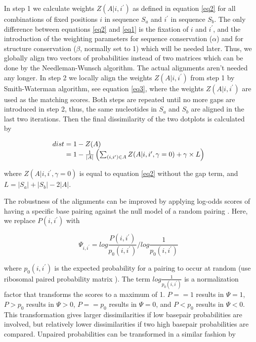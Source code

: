 \documentclass[a4paper,twoside]{article}
\begin{document}
In step 1 we calculate weights $Z(A|i,i^\prime)$ as defined in equation
\ref{eq2} for all combinations of fixed positions $i$ in sequence $S_a$ and
$i^\prime$ in sequence $S_b$.  The only difference between equations \ref{eq2}
and \ref{eq1} is the fixation of $i$ and $i^\prime$, and the introduction of the
weighting parameters for sequence conservation ($\alpha$) and for structure
conservation ($\beta$, normally set to 1) which will be needed later.  Thus, we
globally align two vectors of probabilities instead of two matrices which can be
done by the Needleman-Wunsch algorithm. The actual alignments aren't needed any
longer.  In step 2 we locally align the weights $Z(A|i,i^\prime)$ from step 1 by
Smith-Waterman algorithm, see equation \ref{eq3}, where the weights
$Z(A|i,i^\prime)$ are used as the matching scores.  Both steps are repeated
until no more gaps are introduced in step 2, thus, the same nucleotides in $S_a$
and $S_b$ are aligned in the last two iterations. Then the final dissimilarity
of the two dotplots is calculated by

\begin{equation}\label{eq4}
\arraycolsep=1.4pt
\begin{array}{rl}
	dist = & 1 - Z(A) \\
	     = & 1 - \frac{1}{|A|} \left( \sum_{(i,i^\prime) \in A} Z(A|i,i^\prime,\gamma=0) + \gamma \times L \right)
\end{array}
\end{equation}

where $Z(A|i,i^\prime,\gamma=0)$ is equal to equation \ref{eq2} without the gap
term, and $L = |S_a|+|S_b|-2|A|$.

The robustness of the alignments can be improved by applying log-odds scores of
having a specific base pairing against the null model of a random pairing
\cite{Will17432929}.  Here, we replace $P(i,i^\prime)$ with 

\begin{equation}
	\Psi_{i,i^\prime} = log \frac{P(i,i^\prime)}{p_0(i,i^\prime)} / log
	\frac{1}{p_0(i,i^\prime)} 
\end{equation}

where $p_0(i,i^\prime)$ is the expected probability for a pairing to occur at
random (use ribosomal paired probability matrix
\cite{Knudsen:Hein:RNA_secon_struc:1999}). The term $log
\frac{1}{p_0(i,i^\prime)}$ is a normalization factor that transforms the scores
to a maximum of 1. $P==1$ results in $\Psi=1$, $P>p_0$ results in $\Psi>0$,
$P==p_0$ results in $\Psi=0$, and $P<p_0$ results in $\Psi<0$. This
transformation gives larger dissimilarities if low basepair probabilities are
involved, but relatively lower dissimilarities if two high basepair
probabilities are compared. Unpaired probabilities can be transformed in a
similar fashion by
\end{document}

